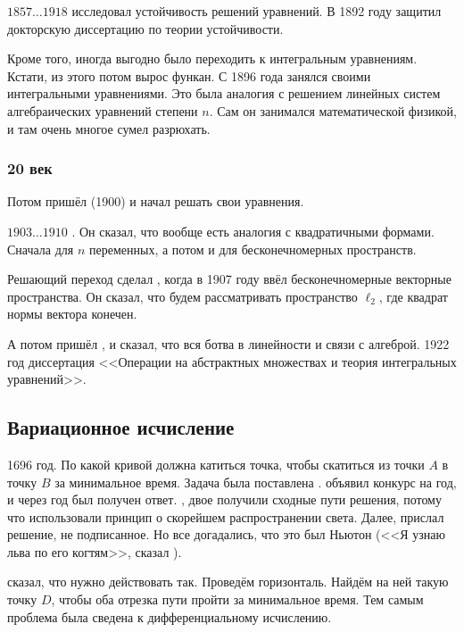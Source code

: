 \documentclass[a4paper,oneside,fleqn,10pt]{article}
\newcommand{\pe}[2]{${#1}\ldots{#2}$}
\begin{document}
 \pe{1857}{1918} исследовал устойчивость решений уравнений.
В 1892 году защитил докторскую диссертацию по теории устойчивости.

Кроме того, иногда выгодно было переходить к интегральным уравнениям.
Кстати, из этого потом вырос функан. С 1896 года  занялся своими
интегральными уравнениями. Это была аналогия с решением линейных систем алгебраических уравнений
степени $n$. Сам он занимался математической физикой, и там очень многое сумел разрюхать.

\subsubsection{20 век}

Потом пришёл  (1900) и начал решать свои уравнения.

\pe{1903}{1910} . Он сказал, что вообще есть аналогия с квадратичными формами.
Сначала для $n$ переменных, а потом и для бесконечномерных пространств.

Решающий переход сделал , когда в 1907 году ввёл бесконечномерные векторные пространства.
Он сказал, что будем рассматривать пространство $\ell_2$, где квадрат нормы вектора конечен.

А потом пришёл , и сказал, что вся ботва в линейности и связи с алгеброй.
1922 год диссертация  <<Операции на абстрактных множествах и теория интегральных уравнений>>.

\subsection{Вариационное исчисление}

1696 год. По какой кривой должна катиться точка, чтобы скатиться из точки $A$ в точку $B$
за минимальное время. Задача была поставлена .
 объявил конкурс на год, и через год был получен ответ.
, двое  получили сходные пути решения, потому что использовали
принцип  о скорейшем распространении света.
Далее,  прислал решение, не подписанное. Но все догадались, что это был Ньютон
(<<Я узнаю льва по его когтям>>, сказал ).

 сказал, что нужно действовать так.
Проведём горизонталь. Найдём на ней такую точку $D$, чтобы оба отрезка пути
пройти за минимальное время. Тем самым проблема была сведена к дифференциальному
исчислению.
\end{document}

